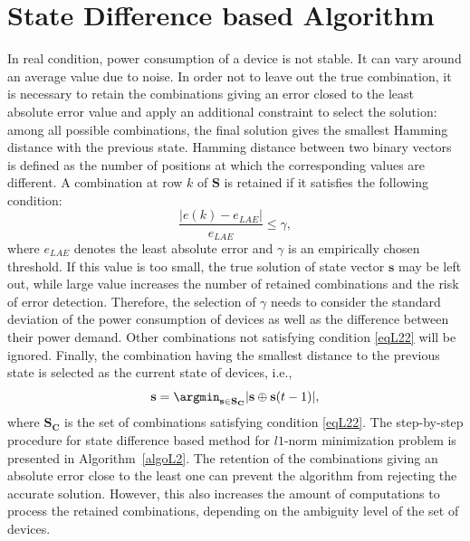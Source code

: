 \section{State Difference based Algorithm}\label{diff}
In real condition, power consumption of a device is not stable. It can vary around an average value due to noise. In order not to leave out the true combination, it is necessary to retain the combinations giving an error closed to the least absolute error value and apply an additional constraint to select the solution: among all possible combinations, the final solution gives the smallest Hamming distance with the previous state. Hamming distance between two binary vectors is defined as the number of positions at which the corresponding values are different. 
A combination at row $k$ of $\mathbf{S}$ is retained if it satisfies the following condition:
\begin{equation}\label{eqL22}
\frac{|e(k)-e_{LAE}|}{e_{LAE}}\leq \gamma,
\end{equation}
where $e_{LAE}$ denotes the least absolute error and $\gamma$ is an empirically chosen threshold.
If this value is too small, the true solution of state vector $\mathbf{s}$ may be left out, while large value increases the number of retained combinations and the risk of error detection. Therefore, the selection of $\gamma$ needs to consider the standard deviation of the power consumption of devices as well as the difference between their power demand. Other combinations not satisfying condition \eqref{eqL22} will be ignored.
Finally, the combination having the smallest distance to the previous state is selected as the current state of devices, i.e.,
\begin{equation}
\mathbf{s} = \argmin_{\mathbf{s}\in \mathbf{S_C}}{|\mathbf{s}\oplus \mathbf{s}(t-1)|},
\end{equation}
where $\mathbf{S_C}$ is the set of combinations satisfying condition \eqref{eqL22}. The step-by-step procedure for state difference based method for $l1$-norm minimization problem is presented in Algorithm~\ref{algoL2}.
The retention of the combinations giving an absolute error close to the least one can prevent the algorithm from rejecting the accurate solution. However, this also increases the amount of computations to process the retained combinations, depending on the ambiguity level of the set of devices.

